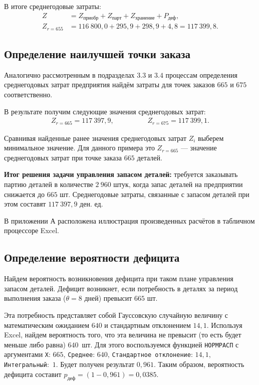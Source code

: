 В итоге среднегодовые затраты:
\begin{align*}
	Z &= Z_{\text{приобр}} + Z_{\text{парт}} + Z_{\text{хранение}} + P_{\text{деф}}, \\
	Z_{r=655} &= 116\:800{,}0 + 295{,}9 + 298{,}9 + 4{,}8 = 117\:399{,}8.
\end{align*}


\subsection{Определение наилучшей точки заказа}

Аналогично рассмотренным в подразделах $3.3$ и $3.4$ процессам определения
среднегодовых затрат предприятия найдём затраты для точек заказов $665$
и $675$ соответственно.

В результате получим следующие значения среднегодовых затрат:
\begin{align*}
	Z_{r = 665} = 117\:397{,}9, \hspace{2cm} Z_{r = 675} = 117\:399{,}1.
\end{align*}

Сравнивая найденные ранее значения среднегодовых затрат $Z_i$ выберем
минимальное значение. Для данного примера это $Z_{r = 665}$ --- значение
среднегодовых затрат при точке заказа $665$ деталей. 

\textbf{Итог решения задачи управления запасом деталей:}
требуется заказывать партию деталей в количестве $2\:960$ штук,
когда запас деталей на предприятии снижается до $665$ шт.
Среднегодовые затраты, связанные с запасом деталей
при этом составят $117\:397{,}9$ ден. ед.

В приложении А расположена иллюстрация произведенных расчётов
в табличном процессоре Excel.

\subsection{Определение вероятности дефицита}

Найдем вероятность возникновения дефицита при таком плане управления запасом деталей.
Дефицит возникнет, если потребность в деталях за период выполнения
заказа ($\theta = 8$ дней) превысит $665$ шт.

Эта потребность представляет собой Гауссовскую случайную величину с математическим
ожиданием $640$ и стандартным отклонением $14{,}1$.
Используя Excel, найдем вероятность того, что эта величина
не превысит (то есть будет меньше либо равна) $640$~шт.
Для этого воспользуемся функцией \texttt{НОРМРАСП} с аргументами 
\texttt{X}: $665$, \texttt{Среднее}: $640$, \texttt{Стандартное отклонение}: $14{,}1$,
\texttt{Интегральный}:~$1$. Будет получен результат $0{,}961$.
Таким образом, вероятность дефицита составит $p_{\text{деф}} = (1 - 0{,}961) = 0{,}0385$.

\newpage